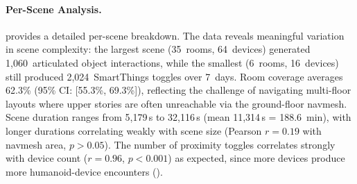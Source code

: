 \paragraph{Per-Scene Analysis.}



 provides a detailed per-scene breakdown.
The data reveals meaningful variation in scene complexity: the
largest scene (35~rooms, 64~devices) generated 1{,}060~articulated
object interactions, while the smallest (6~rooms, 16~devices) still
produced 2{,}024~SmartThings toggles over 7~days.  Room coverage
averages 62.3\% (95\% CI: [55.3\%, 69.3\%]), reflecting the
challenge of navigating multi-floor layouts where upper stories are
often unreachable via the ground-floor navmesh.
Scene duration ranges from 5{,}179\,s to 32{,}116\,s (mean
11{,}314\,s = 188.6~min), with longer durations correlating
weakly with scene size (Pearson $r = 0.19$ with navmesh area,
$p > 0.05$).  The number of proximity toggles correlates strongly
with device count ($r = 0.96$, $p < 0.001$) as expected, since
more devices produce more humanoid-device encounters
().


